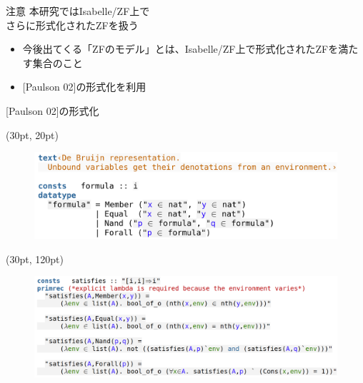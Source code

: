 \documentclass[17pt]{beamer}
\begin{document}
\begin{frame}{注意}
    本研究ではIsabelle/ZF上で\\
    さらに形式化されたZFを扱う
    {\small \begin{itemize} [itemsep=8pt]
        \item 今後出てくる「ZFのモデル」とは、Isabelle/ZF上で形式化されたZFを満たす集合のこと
        \item {[Paulson 02]}の形式化を利用
    \end{itemize}}
\end{frame}

\begin{frame}{[Paulson 02]の形式化}
    \begin{textblock*}{\linewidth}(30pt, 20pt)
        \begin{figure}
            \includegraphics[width=\linewidth]{./images/formula_def.png}
        \end{figure}
    \end{textblock*}
    \begin{textblock*}{\linewidth}(30pt, 120pt)
        \begin{figure}
            \includegraphics[width=\linewidth]{./images/sats_def.png}
        \end{figure}
    \end{textblock*}
\end{frame}
\end{document}
